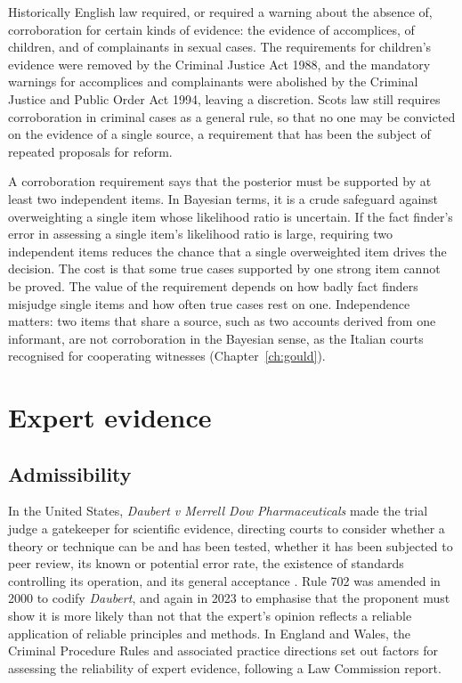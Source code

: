 Historically English law required, or required a warning about the absence of, corroboration for certain kinds of evidence: the evidence of accomplices, of children, and of complainants in sexual cases. The requirements for children's evidence were removed by the Criminal Justice Act 1988, and the mandatory warnings for accomplices and complainants were abolished by the Criminal Justice and Public Order Act 1994, leaving a discretion. Scots law still requires corroboration in criminal cases as a general rule, so that no one may be convicted on the evidence of a single source, a requirement that has been the subject of repeated proposals for reform.

A corroboration requirement says that the posterior must be supported by at least two independent items. In Bayesian terms, it is a crude safeguard against overweighting a single item whose likelihood ratio is uncertain. If the fact finder's error in assessing a single item's likelihood ratio is large, requiring two independent items reduces the chance that a single overweighted item drives the decision. The cost is that some true cases supported by one strong item cannot be proved. The value of the requirement depends on how badly fact finders misjudge single items and how often true cases rest on one. Independence matters: two items that share a source, such as two accounts derived from one informant, are not corroboration in the Bayesian sense, as the Italian courts recognised for cooperating witnesses (Chapter~\ref{ch:gould}).

\section{Expert evidence}

\subsection{Admissibility}

In the United States, \emph{Daubert v Merrell Dow Pharmaceuticals} made the trial judge a gatekeeper for scientific evidence, directing courts to consider whether a theory or technique can be and has been tested, whether it has been subjected to peer review, its known or potential error rate, the existence of standards controlling its operation, and its general acceptance \citep{daubert1993}. Rule 702 was amended in 2000 to codify \emph{Daubert}, and again in 2023 to emphasise that the proponent must show it is more likely than not that the expert's opinion reflects a reliable application of reliable principles and methods. In England and Wales, the Criminal Procedure Rules and associated practice directions set out factors for assessing the reliability of expert evidence, following a Law Commission report.

